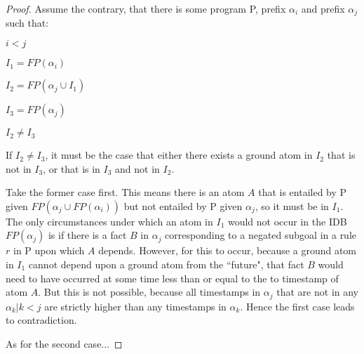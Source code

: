 \begin{proof}



Assume the contrary, that there is some program P, prefix $\alpha_i$ and prefix $\alpha_j$  such that:

$i < j$

$I_1 = FP(\alpha_i)$

$I_2 = FP(\alpha_j \cup I_1)$

$I_3 = FP(\alpha_j)$

$I_2 \neq I_3$


If $I_2 \neq I_3$, it must be the case that either there exists a ground atom in $I_2$ that is not in $I_3$, or that is in
$I_3$ and not in $I_2$.  

Take the former case first.  This means there is an atom $A$ that is entailed by P given $FP(\alpha_{j} \cup FP(\alpha_{i}))$
but not entailed by P given $\alpha_{j}$, so it must be in $I_1$.   The only circumstances under which an atom in
$I_1$ would not occur in the IDB $FP(\alpha_{j})$ is if there is a fact $B$ in $\alpha_{j}$ 
corresponding to a negated subgoal in a rule $r$ in P upon which $A$ depends.  However, for this to occur, because a ground atom 
in $I_1$ cannot depend upon a ground atom from the ``future", that fact $B$ would need to have occurred at some time less than 
or equal to the to timestamp of atom $A$.  But this is not possible, because all timestamps in $\alpha_{j}$ that are not in any $\alpha_{k} | k<j$
are strictly higher than any timestamps in $\alpha_{k}$.  Hence the first case leads to contradiction.

As for the second case...

\end{proof}

